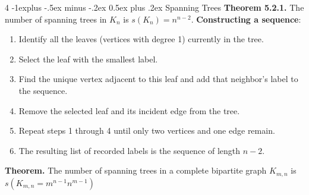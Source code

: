 \documentclass[letterpaper, 8pt]{extarticle}
\makeatletter
\renewcommand{\section}{\@startsection{section}{1}{0mm}%
	{-1explus -.5ex minus -.2ex}%
	{0.5ex plus .2ex}%
	{\normalfont\normalsize\bfseries}}
\makeatother
\begin{document}
\begin{multicols*}{4}
	\section{Spanning Trees}
	\textbf{Theorem 5.2.1.} The number of spanning trees in $K_n$ is $s(K_n) = n^{n-2}$.
	\textbf{Constructing a sequence}:
	\begin{enumerate}
		\item Identify all the leaves (vertices with degree 1) currently in the tree.
		\item Select the leaf with the smallest label.
		\item Find the unique vertex adjacent to this leaf and add that neighbor's label to the sequence.
		\item Remove the selected leaf and its incident edge from the tree.
		\item Repeat steps 1 through 4 until only two vertices and one edge remain.
		\item The resulting list of recorded labels is the sequence of length $n-2$.
	\end{enumerate}
	\textbf{Theorem.} The number of spanning trees in a complete bipartite graph $K_{m,n}$ is $s(K_{m,n} = m^{n-1}n^{m-1})$ \\




\end{multicols*}
\end{document}
